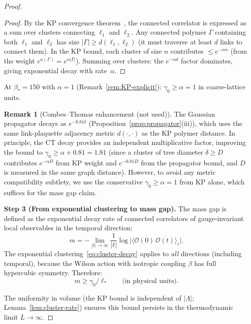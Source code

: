 \documentclass[11pt]{article}
\theoremstyle{definition}
\newtheorem{remark}[theorem]{Remark}
\begin{document}
\begin{proof}
\begin{proof}
By the KP convergence theorem~\cite{KP}, the connected
correlator is expressed as a sum over clusters connecting
$\ell_1$ and $\ell_2$.  Any connected polymer $\Gamma$
containing both $\ell_1$ and $\ell_2$ has size
$|\Gamma|\ge d(\ell_1,\ell_2)$ (it must traverse at least
$d$ links to connect them).  In the KP bound, each cluster
of size $n$ contributes $\le e^{-\alpha n}$ (from the
weight $e^{a(\Gamma)}=e^{\alpha|\Gamma|}$).  Summing over
clusters: the $e^{-\alpha d}$ factor dominates, giving
exponential decay with rate~$\alpha$.
\end{proof}

At $\beta_*=150$ with $\alpha=1$
(Remark~\ref{rem:KP-explicit}): $\gamma_0\ge\alpha=1$ in
coarse-lattice units.

\begin{remark}[Combes--Thomas enhancement (not used)]
The Gaussian propagator decays as $e^{-0.81\delta}$
(Proposition~\ref{prop:propagator}(iii)), which uses the
same link-plaquette adjacency metric $d(\cdot,\cdot)$ as
the KP polymer distance.  In principle, the CT decay provides
an independent multiplicative factor, improving the bound to
$\gamma_0\ge\alpha+0.81=1.81$ (since a cluster of tree diameter
$\delta\ge D$ contributes $e^{-\alpha D}$ from KP weight and
$e^{-0.81 D}$ from the propagator bound, and $D$ is measured
in the same graph distance).  However, to avoid any metric
compatibility subtlety, we use the conservative
$\gamma_0\ge\alpha=1$ from KP alone, which suffices for the
mass gap claim.
\end{remark}

\medskip\noindent\textbf{Step 3 (From exponential clustering to
mass gap).}
The mass gap is defined as the exponential decay rate of connected
correlators of gauge-invariant local observables in the temporal
direction:
\begin{equation}
m=-\lim_{|t|\to\infty}\frac{1}{|t|}
\log\bigl|\langle\mathcal{O}(0)\,\mathcal{O}(t)\rangle_c\bigr|.
\end{equation}
The exponential clustering~\eqref{eq:cluster-decay} applies to
\emph{all} directions (including temporal), because the Wilson
action with isotropic coupling $\beta$ has full hypercubic symmetry.
Therefore:
\begin{equation}
m\ge\gamma_0/\ell_*\qquad\text{(in physical units)}.
\end{equation}

The uniformity in volume (the KP bound is independent of $|\Lambda|$;
Lemma~\ref{lem:cluster-rate})
ensures this bound persists in the thermodynamic limit $L\to\infty$.


\end{proof}
\end{document}
